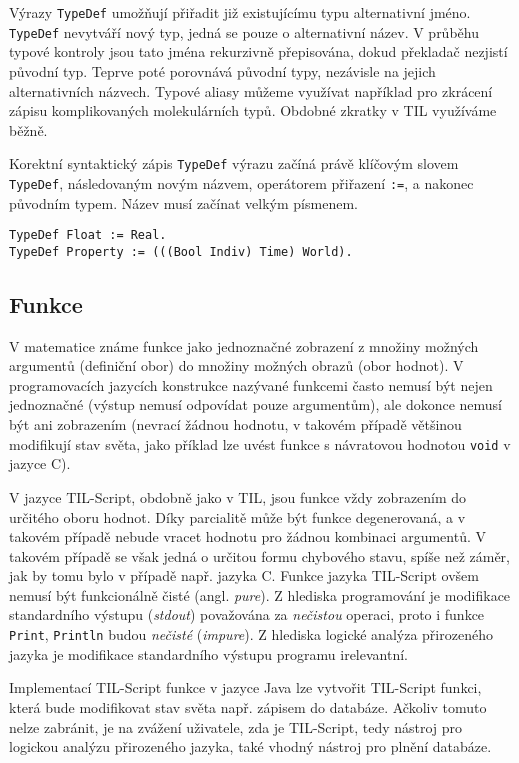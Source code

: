 Výrazy \lstinline{TypeDef} umožňují přiřadit již existujícímu typu alternativní jméno.
\lstinline{TypeDef} nevytváří nový typ, jedná se pouze o alternativní název. V průběhu typové
kontroly jsou tato jména rekurzivně přepisována, dokud překladač nezjistí původní typ. Teprve poté
porovnává původní typy, nezávisle na jejich alternativních názvech. Typové aliasy můžeme využívat
například pro zkrácení zápisu komplikovaných molekulárních typů. Obdobné zkratky v TIL využíváme
běžně.

Korektní syntaktický zápis \lstinline{TypeDef} výrazu začíná právě klíčovým slovem
\lstinline{TypeDef}, následovaným novým názvem, operátorem přiřazení \lstinline{:=}, a nakonec
původním typem. Název musí začínat velkým písmenem.

\begin{lstlisting}[caption={Výraz TypeDef}]
TypeDef Float := Real.
TypeDef Property := (((Bool Indiv) Time) World).
\end{lstlisting}

\subsection{Funkce}

V matematice známe funkce jako jednoznačné zobrazení z množiny možných argumentů (definiční obor)
do množiny možných obrazů (obor hodnot). V programovacích jazycích konstrukce nazývané funkcemi
často nemusí být nejen jednoznačné (výstup nemusí odpovídat pouze argumentům), ale dokonce nemusí
být ani zobrazením (nevrací žádnou hodnotu, v takovém případě většinou modifikují stav světa,
jako příklad lze uvést funkce s návratovou hodnotou \lstinline{void} v jazyce C).

V jazyce TIL-Script, obdobně jako v TIL, jsou funkce vždy zobrazením do určitého oboru hodnot. Díky
parcialitě může být funkce degenerovaná, a v takovém případě nebude vracet hodnotu pro žádnou
kombinaci argumentů. V takovém případě se však jedná o určitou formu chybového stavu, spíše než
záměr, jak by tomu bylo v případě např. jazyka C. Funkce jazyka TIL-Script ovšem nemusí být
funkcionálně čisté (angl. \textit{pure}). Z hlediska programování je modifikace standardního výstupu
(\textit{stdout}) považována za \textit{nečistou} operaci, proto i funkce \lstinline{Print},
\lstinline{Println} budou \textit{nečisté} (\textit{impure}). Z hlediska logické analýza přirozeného
jazyka je modifikace standardního výstupu programu irelevantní.

Implementací TIL-Script funkce v jazyce Java lze vytvořit TIL-Script funkci, která bude modifikovat
stav světa např. zápisem do databáze. Ačkoliv tomuto nelze zabránit, je na zvážení uživatele, zda
je TIL-Script, tedy nástroj pro logickou analýzu přirozeného jazyka, také vhodný nástroj pro plnění
databáze.

